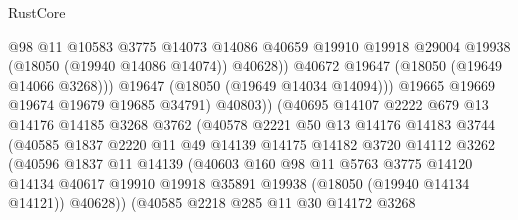 \begin{lexlean}{RustCore}
\begin{coremodule}
                                @98
                                @11
                                @10583
                                @3775
                                @14073
                                @14086
                                @40659
                                @19910
                                @19918
                                @29004
                                @19938
                                (@18050 (@19940 @14086 @14074))
                                @40628))
                            @40672
                            @19647
                            (@18050 (@19649 @14066 @3268)))
                          @19647
                          (@18050 (@19649 @14034 @14094)))
                        @19665
                        @19669
                        @19674
                        @19679
                        @19685
                        @34791)
                      @40803))
                  (@40695
                    @14107
                    @2222
                    @679
                    @13
                    @14176
                    @14185
                    @3268
                    @3762
                    (@40578
                      @2221
                      @50
                      @13
                      @14176
                      @14183
                      @3744
                      (@40585
                        @1837
                        @2220
                        @11
                        @49
                        @14139
                        @14175
                        @14182
                        @3720
                        @14112
                        @3262
                        (@40596
                          @1837
                          @11
                          @14139
                          (@40603
                            @160
                            @98
                            @11
                            @5763
                            @3775
                            @14120
                            @14134
                            @40617
                            @19910
                            @19918
                            @35891
                            @19938
                            (@18050 (@19940 @14134 @14121))
                            @40628))
                        (@40585
                          @2218
                          @285
                          @11
                          @30
                          @14172
                          @3268

\end{coremodule}
\end{lexlean}
